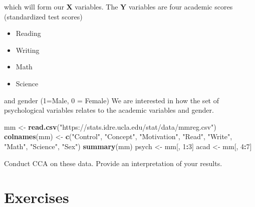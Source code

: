 \documentclass[]{book}
\newenvironment{Shaded}{\begin{snugshade}}{\end{snugshade}}
\newcommand{\DecValTok}[1]{\textcolor[rgb]{0.00,0.00,0.81}{#1}}
\newcommand{\KeywordTok}[1]{\textcolor[rgb]{0.13,0.29,0.53}{\textbf{#1}}}
\newcommand{\NormalTok}[1]{#1}
\newcommand{\OperatorTok}[1]{\textcolor[rgb]{0.81,0.36,0.00}{\textbf{#1}}}
\newcommand{\StringTok}[1]{\textcolor[rgb]{0.31,0.60,0.02}{#1}}
\providecommand{\tightlist}{%
  \setlength{\itemsep}{0pt}\setlength{\parskip}{0pt}}
\theoremstyle{definition}
\theoremstyle{definition}
\theoremstyle{definition}
\theoremstyle{remark}
\begin{document}
which will form our \(\mathbf X\) variables. The \(\mathbf Y\) variables are four academic scores (standardized test scores)

\begin{itemize}
\tightlist
\item
  Reading
\item
  Writing
\item
  Math
\item
  Science
\end{itemize}

and gender (1=Male, 0 = Female) We are interested in how the set of psychological variables relates to the academic variables and gender.

\begin{Shaded}
\begin{Highlighting}[]
\NormalTok{mm <-}\StringTok{ }\KeywordTok{read.csv}\NormalTok{(}\StringTok{"https://stats.idre.ucla.edu/stat/data/mmreg.csv"}\NormalTok{)}
\KeywordTok{colnames}\NormalTok{(mm) <-}\StringTok{ }\KeywordTok{c}\NormalTok{(}\StringTok{"Control"}\NormalTok{, }\StringTok{"Concept"}\NormalTok{, }\StringTok{"Motivation"}\NormalTok{, }\StringTok{"Read"}\NormalTok{, }\StringTok{"Write"}\NormalTok{, }\StringTok{"Math"}\NormalTok{,}
    \StringTok{"Science"}\NormalTok{, }\StringTok{"Sex"}\NormalTok{)}
\KeywordTok{summary}\NormalTok{(mm)}
\NormalTok{psych <-}\StringTok{ }\NormalTok{mm[, }\DecValTok{1}\OperatorTok{:}\DecValTok{3}\NormalTok{]}
\NormalTok{acad <-}\StringTok{ }\NormalTok{mm[, }\DecValTok{4}\OperatorTok{:}\DecValTok{7}\NormalTok{]}
\end{Highlighting}
\end{Shaded}

Conduct CCA on these data. Provide an interpretation of your results.

\hypertarget{exercises-2}{%
\section{Exercises}\label{exercises-2}}
\end{document}
